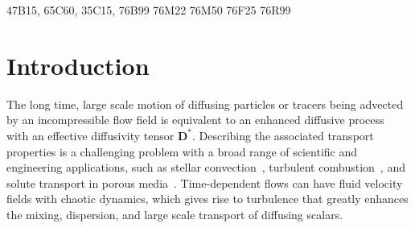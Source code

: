\documentclass[leqno,onefignum,onetabnum]{siamltex1213}
\begin{document}
\begin{AMS}
47B15,
65C60,
35C15,
76B99
76M22
76M50
76F25
76R99   	
\end{AMS}


\pagestyle{myheadings}
\thispagestyle{plain}



\section{Introduction}\label{sec:Introduction}
The long time, large scale motion of diffusing particles or
tracers being advected by an incompressible flow field is equivalent
to an enhanced diffusive process~\cite{Taylor:PRSL:196} with an
effective diffusivity tensor $\mathbf{D}^*$. Describing the associated
transport properties is a challenging problem with a broad range of
scientific and engineering applications, such as stellar
convection~\cite{Knobloch:1992ApJ,Press:1981:ApJ,canut98,canut98b,canut00},
turbulent
combustion~\cite{Aslanyan:BF00790149,Bilger:05:10.1016,Tabaczynski:1990:243,Williams:1985:TC:9781611971064,Peters:2000:TC:9780521660822,Xin:2009:Fronts:9780387876832},
and solute transport in porous
media~\cite{Bhattacharya:AAP:1999:951,Bhattacharya:1989:ASD,Whitaker:AIC690130308,Gupta:WRCR3940,Koch:1988:965,Lester:PRL:111.174101,Koch:JFM:7961001}.
Time-dependent flows can have fluid velocity fields with chaotic
dynamics, which gives rise to turbulence that greatly enhances the
mixing, dispersion, and large scale transport of diffusing scalars.   
\end{document}
